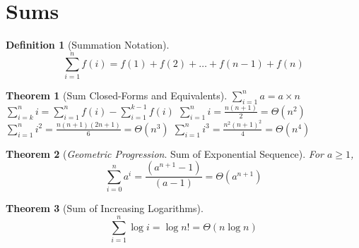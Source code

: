 \documentclass[]{tufte-handout}
\newtheorem{theorem}{Theorem}
\newtheorem{definition}{Definition}
\begin{document}
\section{Sums}

\begin{definition}[Summation Notation]
\leavevmode\newline{}
\[ \sum\limits_{i=1}^{n} f(i) = f(1) + f(2) + \ldots + f(n-1) + f(n) \]
\end{definition}

\begin{theorem}[Sum Closed-Forms and Equivalents]
\leavevmode\newline
\hspace{.25in}$\sum\limits_{i=1}^{n} a = a \times n$\newline
\hspace{.25in}$\sum\limits_{i=k}^{n} i = \sum\limits_{i=1}^{n} f(i) - \sum\limits_{i=1}^{k-1} f(i)$ \newline
\hspace{.25in}$\sum\limits_{i=1}^{n} i = \frac{n(n+1)}{2} = \Theta(n^2)$\newline
\hspace{.25in}$\sum\limits_{i=1}^{n} i^2 = \frac{n(n+1)(2n+1)}{6} = \Theta(n^3)$\newline
\hspace{.25in}$\sum\limits_{i=1}^{n} i^3 = \frac{n^2(n+1)^2}{4} = \Theta(n^4)$\newline
\end{theorem}

\begin{theorem}[\textit{Geometric Progression}. Sum of Exponential Sequence]
\leavevmode\newline{}
For $a \geq 1$, \[\sum\limits_{i=0}^{n} a^i = \frac{(a^{n+1} -1)}{(a-1)} = \Theta(a^{n+1})\]
\end{theorem}

\begin{theorem}[Sum of Increasing Logarithms]
\leavevmode\newline{}
\[\sum\limits_{i=1}^{n} \log i  = \log n! = \Theta(n \log n )\]
\end{theorem}
\end{document}
